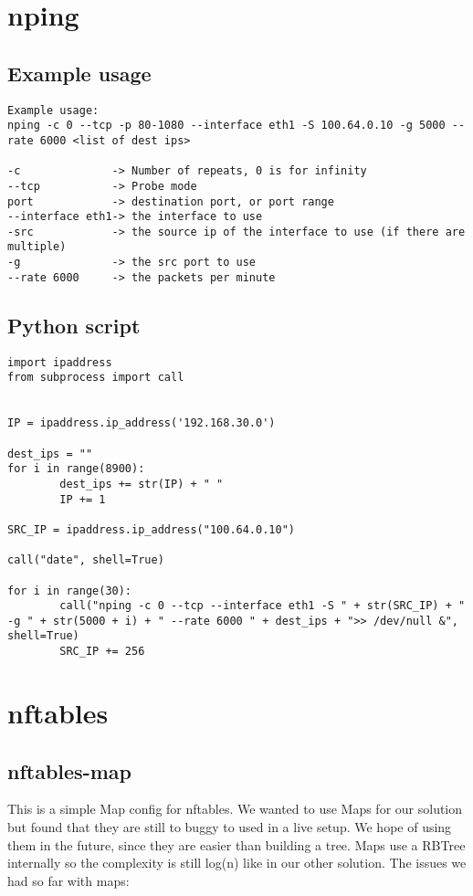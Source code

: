 \documentclass{report}
\begin{document}
\section{nping}\label{nping}

\subsection{Example usage}

\begin{verbatim}
Example usage:
nping -c 0 --tcp -p 80-1080 --interface eth1 -S 100.64.0.10 -g 5000 --rate 6000 <list of dest ips>

-c              -> Number of repeats, 0 is for infinity
--tcp           -> Probe mode
port            -> destination port, or port range
--interface eth1-> the interface to use
-src            -> the source ip of the interface to use (if there are multiple)
-g              -> the src port to use
--rate 6000     -> the packets per minute
\end{verbatim}
 
\subsection{Python script}

\begin{verbatim}
import ipaddress
from subprocess import call


IP = ipaddress.ip_address('192.168.30.0')

dest_ips = ""
for i in range(8900):
        dest_ips += str(IP) + " "
        IP += 1

SRC_IP = ipaddress.ip_address("100.64.0.10")

call("date", shell=True)

for i in range(30):
        call("nping -c 0 --tcp --interface eth1 -S " + str(SRC_IP) + " -g " + str(5000 + i) + " --rate 6000 " + dest_ips + ">> /dev/null &", shell=True)
        SRC_IP += 256
\end{verbatim}

\section{nftables}\label{nftables-1}

\subsection{nftables-map}

This is a simple Map config for nftables. We wanted to use Maps for our
solution but found that they are still to buggy to used in a live setup.
We hope of using them in the future, since they are easier than building
a tree. Maps use a RBTree internally so the complexity is still
log(n) like in our other solution. The issues we had so far with maps:
\end{document}
